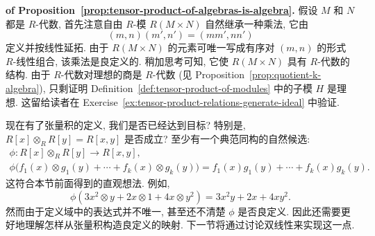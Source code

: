 \begin{Proof}\textbf{of Proposition~\ref{prop:tensor-product-of-algebras-is-algebra}.}\quad
假设 $M$ 和 $N$ 都是 $R$-代数, 首先注意自由 $R$-模 $R(M\times N)$ 自然继承一种乘法, 它由
\[
  (m,n)(m',n')=(mm',nn')
\]
定义并按线性延拓. 由于 $R(M\times N)$ 的元素可唯一写成有序对 $(m,n)$ 的形式 $R$-线性组合, 该乘法是良定义的. 稍加思考可知, 它使 $R(M\times N)$ 具有 $R$-代数的结构. 由于 $R$-代数对理想的商是 $R$-代数 (见 Proposition~\ref{prop:quotient-k-algebra}), 只剩证明 Definition~\ref{def:tensor-product-of-modules} 中的子模 $H$ 是理想. 这留给读者在 Exercise~\ref{ex:tensor-product-relations-generate-ideal} 中验证.
\end{Proof}

现在有了张量积的定义, 我们是否已经达到目标? 特别是, $R[x]\otimes_{R}R[y]=R[x,y]$ 是否成立? 至少有一个典范同构的自然候选:
\[
  \begin{gathered}
    \phi:R[x]\otimes_{R}R[y]\to R[x,y],\\
    \phi\bigl(f_{1}(x)\otimes g_{1}(y)+\cdots+f_{k}(x)\otimes g_{k}(y)\bigr)
    =f_{1}(x)g_{1}(y)+\cdots+f_{k}(x)g_{k}(y).
  \end{gathered}
\]
这符合本节前面得到的直观想法. 例如,
\[
  \phi(3x^{2}\otimes y+2x\otimes1+4x\otimes y^{2})=3x^{2}y+2x+4xy^{2}.
\]
然而由于定义域中的表达式并不唯一, 甚至还不清楚 $\phi$ 是否良定义. 因此还需要更好地理解怎样从张量积构造良定义的映射. 下一节将通过讨论双线性来实现这一点.


